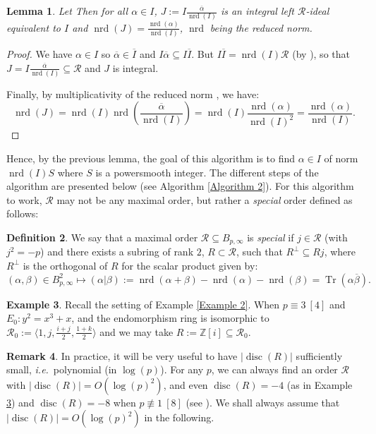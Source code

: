 \documentclass[a4paper,10pt,notitlepage]{report}
\theoremstyle{definition}
\newtheorem{Definition}{Definition}[chapter]
\theoremstyle{plain}
\newtheorem{Lemma}[Definition]{Lemma}
\theoremstyle{definition}
\newtheorem{Remark}[Definition]{Remark}
\newtheorem{Example}[Definition]{Example}
\newcommand{\ie}{\emph{i.e.}\ }
\newcommand{\Z}{\mathbb{Z}}
\newcommand{\m}[1]{\mathcal{#1}}
\renewcommand{\(}{\left(}
\renewcommand{\)}{\right)}
\DeclareMathOperator{\Tr}{Tr}
\DeclareMathOperator{\disc}{disc}
\DeclareMathOperator{\nrd}{nrd}
\begin{document}
\begin{Lemma}\label{Lemma 5}
Let  Then for all $\alpha\in I$, $J:=I\frac{\overline{\alpha}}{\nrd(I)}$ is an integral left $\m{R}$-ideal equivalent to $I$ and $\nrd(J)=\frac{\nrd(\alpha)}{\nrd(I)}$, $\nrd$ being the reduced norm.
\end{Lemma}

\begin{proof}
We have $\alpha\in I$ so $\overline{\alpha}\in \overline{I}$ and $I\overline{\alpha}\subseteq I\overline{I}$. But $I\overline{I}=\nrd(I)\m{R}$ (by \cite[16.6.14]{Voight}), so that $J=I\frac{\overline{\alpha}}{\nrd(I)}\subseteq \m{R}$ and $J$ is integral. 

Finally, by multiplicativity of the reduced norm \cite[Lemma 16.3.7]{Voight}, we have:
\[\nrd(J)=\nrd(I)\nrd\(\frac{\overline{\alpha}}{\nrd(I)}\)=\nrd(I)\frac{\nrd(\alpha)}{\nrd(I)^2}=\frac{\nrd(\alpha)}{\nrd(I)}.\]
\end{proof}

Hence, by the previous lemma, the goal of this algorithm is to find $\alpha\in I$ of norm $\nrd(I)S$ where $S$ is a powersmooth integer.  The different steps of the algorithm are presented below (see Algorithm \ref{Algorithm 2}). For this algorithm to work, $\m{R}$ may not be any maximal order, but rather a \emph{special} order defined as follows:

\begin{Definition}\label{Definition 2}
We say that a maximal order $\m{R}\subseteq B_{p,\infty}$ is \emph{special} if $j\in \m{R}$ (with $j^2=-p$) and there exists a subring of rank $2$, $R\subset\m{R}$, such that $R^\bot\subseteq Rj$, where $R^\bot$ is the orthogonal of $R$ for the scalar product given by:
\[(\alpha,\beta)\in B_{p,\infty}^2\longmapsto (\alpha|\beta):=\nrd(\alpha+\beta)-\nrd(\alpha)-\nrd(\beta)=\Tr(\alpha\overline{\beta}).\]
\end{Definition}

\begin{Example}\label{Example 3}
Recall the setting of Example \ref{Example 2}. When $p\equiv 3 \ [4]$ and $E_0: y^2=x^3+x$,  and the endomorphism ring is isomorphic to $\m{R}_0:= \langle 1,j, \frac{i+j}{2},\frac{1+k}{2}\rangle$ and we may take $R:=\Z[i]\subseteq\m{R}_0$.
\end{Example}

\begin{Remark}
In practice, it will be very useful to have $|\disc(R)|$ sufficiently small, \ie  polynomial (in $\log(p)$).  For any $p$, we can always find an order $\m{R}$ with $|\disc(R)|=O(\log(p)^2)$, and even $\disc(R)=-4$ (as in Example \ref{Example 3}) and $\disc(R)=-8$ when $p\not\equiv 1 \ [8]$ (see \cite[Section 2.3]{KLPT}). We shall always assume that $|\disc(R)|=O(\log(p)^2)$ in the following.
\end{Remark}
\end{document}
